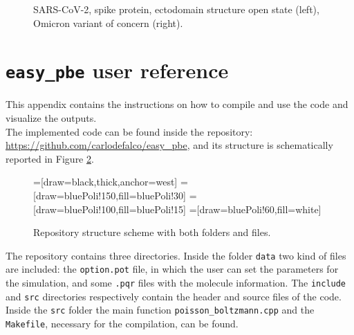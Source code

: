 \documentclass[11pt,a4paper]{article}
\begin{document}
\begin{figure}[H]
{    }
    \caption[]{SARS-CoV-2, spike protein,  ectodomain structure open state (left), 
    Omicron variant of concern (right).}
    \label{fig:covid}
\end{figure}




\appendix
\section{\texttt{easy\_pbe} user reference}
\label{App_A}
This appendix contains the instructions on how to compile and use the code and  visualize the outputs. \\
The implemented code can be found inside the repository: \url{https://github.com/carlodefalco/easy_pbe}, and its structure is schematically reported in Figure \ref{code_structure}. 

\begin{figure} [H]
\centering
{}=[draw=black,thick,anchor=west]
=[draw=bluePoli!150,fill=bluePoli!30]
=[draw=bluePoli!100,fill=bluePoli!15]
=[draw=bluePoli!60,fill=white]
\caption{Repository structure scheme with both folders and files.}
\label{code_structure}
\end{figure}
The repository contains three directories. Inside the folder \texttt{data} two kind of files are included: the \texttt{option.pot} file, in which the user can set the parameters for the simulation, and some \texttt{.pqr} files with the molecule information. The \texttt{include} and \texttt{src} directories respectively contain the header and source files of the code. Inside the \texttt{src} folder the main function \texttt{poisson\_boltzmann.cpp} and the \texttt{Makefile}, necessary for the compilation, can be found.
\end{document}
